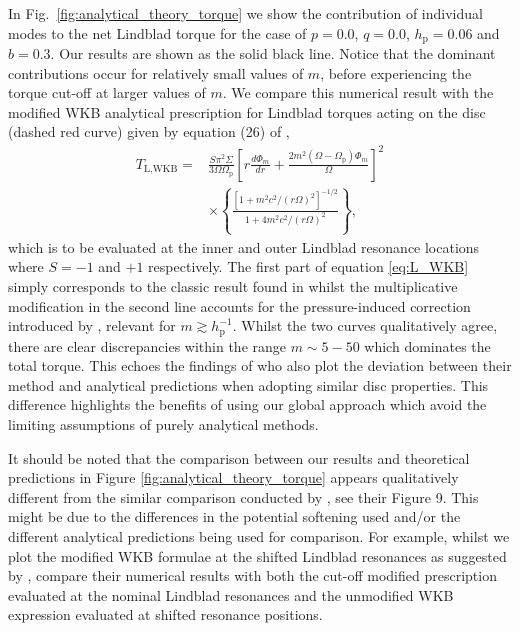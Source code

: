 In Fig.~\ref{fig:analytical_theory_torque} we show the contribution of individual modes to the net Lindblad torque for the case of $p=0.0$, $q=0.0$, $h_\mathrm{p}=0.06$ and $b=0.3$. Our results are shown as the solid black line. Notice that the dominant contributions occur for relatively small values of $m$, before experiencing the torque cut-off at larger values of $m$. We compare this numerical result with the modified WKB analytical prescription for Lindblad torques acting on the disc (dashed red curve) given by equation (26) of \cite{PapaloizouLarwood_2000},
%
\begin{align}
    \label{eq:L_WKB}
    T_{\textrm{L},\textrm{WKB}} = & \frac{S \pi^2 \Sigma}{3 \Omega \Omega_\textrm{p}} 
    \left[r\frac{d\Phi_{m}}{dr}+\frac{2 m^2 (\Omega-\Omega_\textrm{p})\Phi_{m}}{\Omega}\right]^2 \nonumber \\
    & \times \left\lbrace \frac{\left[1+m^2 c^2/(r\Omega)^2\right]^{-1/2}}{1+4m^2c^2/(r\Omega)^2}\right\rbrace ,
\end{align}
%
which is to be evaluated at the inner and outer Lindblad resonance locations where $S=-1$ and $+1$ respectively. The first part of equation \eqref{eq:L_WKB} simply corresponds to the classic result found in \cite{GoldreichTremaine_1979} whilst the multiplicative modification in the second line accounts for the pressure-induced correction introduced by \cite{Artymowicz_1993}, relevant for $m \gtrsim h_\textrm{p}^{-1}$. Whilst the two curves qualitatively agree, there are clear discrepancies within the range $m\sim 5-50$ which dominates the total torque. This echoes the findings of \cite{KorycanskyPollack_1993} who also plot the deviation between their method and analytical predictions when adopting similar disc properties. This difference highlights the benefits of using our global approach which avoid the limiting assumptions of purely analytical methods. 

It should be noted that the comparison between our results and theoretical predictions in Figure \ref{fig:analytical_theory_torque} appears qualitatively different from the similar comparison conducted by \cite{KorycanskyPollack_1993}, see their Figure 9. This might be due to the differences in the potential softening used and/or the different analytical predictions being used for comparison. For example, whilst we plot the \cite{Artymowicz_1993} modified WKB formulae at the shifted Lindblad resonances as suggested by \cite{PapaloizouLarwood_2000}, \cite{KorycanskyPollack_1993} compare their numerical results with both the cut-off modified prescription evaluated at the nominal Lindblad resonances and the unmodified \cite{GoldreichTremaine_1979} WKB expression evaluated at shifted resonance positions. 

